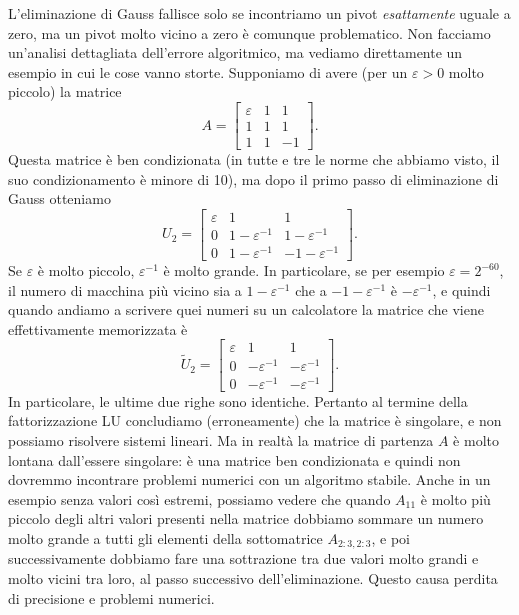\documentclass[a4paper]{report}
\theoremstyle{definition}
\theoremstyle{remark}
\begin{document}
L'eliminazione di Gauss fallisce solo se incontriamo un pivot \emph{esattamente} uguale a zero, ma un pivot molto vicino a zero è comunque problematico. Non facciamo un'analisi dettagliata dell'errore algoritmico, ma vediamo direttamente un esempio in cui le cose vanno storte. Supponiamo di avere (per un $\varepsilon>0$ molto piccolo) la matrice
\[
A = \begin{bmatrix}
    \varepsilon & 1 & 1\\
    1 & 1 & 1\\
    1 & 1 & -1
\end{bmatrix}.
\]
Questa matrice è ben condizionata (in tutte e tre le norme che abbiamo visto, il suo condizionamento è minore di 10), ma dopo il primo passo di eliminazione di Gauss otteniamo
\[
U_2 = \begin{bmatrix}
    \varepsilon & 1 & 1\\
    0 & 1-\varepsilon^{-1} & 1-\varepsilon^{-1}\\
    0 & 1-\varepsilon^{-1} & -1-\varepsilon^{-1}
\end{bmatrix}.
\]
Se $\varepsilon$ è molto piccolo, $\varepsilon^{-1}$ è molto grande. In particolare, se per esempio $\varepsilon = 2^{-60}$, il numero di macchina più vicino sia a $1-\varepsilon^{-1}$ che a $-1-\varepsilon^{-1}$ è $-\varepsilon^{-1}$, e quindi quando andiamo a scrivere quei numeri su un calcolatore la matrice che viene effettivamente memorizzata è
\[
\tilde{U}_2 = 
\begin{bmatrix}  
    \varepsilon & 1 & 1\\
    0 & -\varepsilon^{-1} & -\varepsilon^{-1}\\
    0 & -\varepsilon^{-1} & -\varepsilon^{-1}
\end{bmatrix}.
\]
In particolare, le ultime due righe sono identiche. Pertanto al termine della fattorizzazione LU concludiamo (erroneamente) che la matrice è singolare, e non possiamo risolvere sistemi lineari. Ma in realtà la matrice di partenza $A$ è molto lontana dall'essere singolare: è una matrice ben condizionata e quindi non dovremmo incontrare problemi numerici con un algoritmo stabile. Anche in un esempio senza valori così estremi, possiamo vedere che quando $A_{11}$ è molto più piccolo degli altri valori presenti nella matrice dobbiamo sommare un numero molto grande a tutti gli elementi della sottomatrice $A_{2:3,2:3}$, e poi successivamente dobbiamo fare una sottrazione tra due valori molto grandi e molto vicini tra loro, al passo successivo dell'eliminazione. Questo causa perdita di precisione e problemi numerici.
\end{document}
